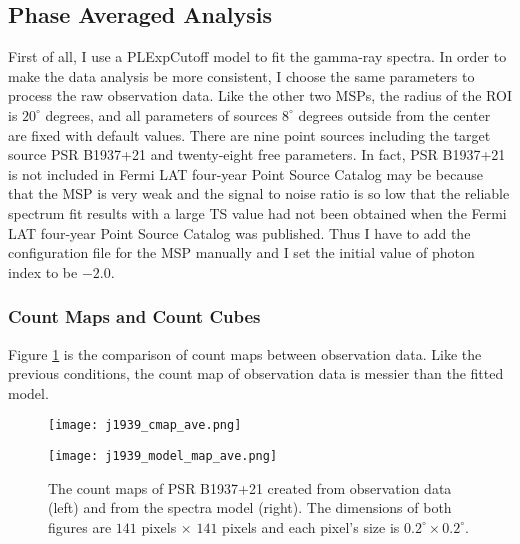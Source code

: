 \documentclass[12pt]{report}
\newcommand{\fgl}[0]{
  Fermi LAT four-year Point Source Catalog
}
\begin{document}
    \subsection{Phase Averaged Analysis}
      First of all, I use a PLExpCutoff model to fit the gamma-ray spectra. 
      In order to make the data analysis be more consistent, I choose the same parameters
      to process the raw observation data. Like the other two MSPs, the radius of the ROI 
      is $20^{\circ}$ degrees, and all parameters of sources $8^{\circ}$ degrees outside 
      from the center are fixed with default values. There are nine point sources including 
      the target source PSR B1937+21 and twenty-eight free parameters. In fact, PSR B1937+21
      is not included in \fgl{} may be because that the MSP is very weak and the signal to 
      noise ratio is so low that the reliable spectrum fit results with a large TS value 
      had not been obtained when the \fgl{} was published. Thus I have to add the 
      configuration file for the MSP manually and I set the initial value of photon index 
      to be $-2.0$.

      \subsubsection{Count Maps and Count Cubes}
        Figure \ref{fig: j1939_count_map_ave} is the comparison of count maps between 
        observation data. Like the previous conditions, the count map of observation data is 
        messier than the fitted model. 

        \begin{figure}[!ht]
          \begin{center}
          \begin{minipage}{0.45\textwidth}
            \begin{center} 
              \texttt{[image: j1939\_cmap\_ave.png]}
            \end{center}
          \end{minipage}
          \begin{minipage}{0.45\textwidth}
            \begin{center}
              \texttt{[image: j1939\_model\_map\_ave.png]}
            \end{center}
          \end{minipage}
        \end{center}
        \caption{The count maps of PSR B1937+21 created from observation 
            data (left) and from the spectra model (right). The dimensions
            of both figures are $141$ pixels $\times$ $141$ pixels and each pixel's size is
            $0.2^{\circ}\times0.2^{\circ}$.}
          \label{fig: j1939_count_map_ave}
        \end{figure}
\end{document}
